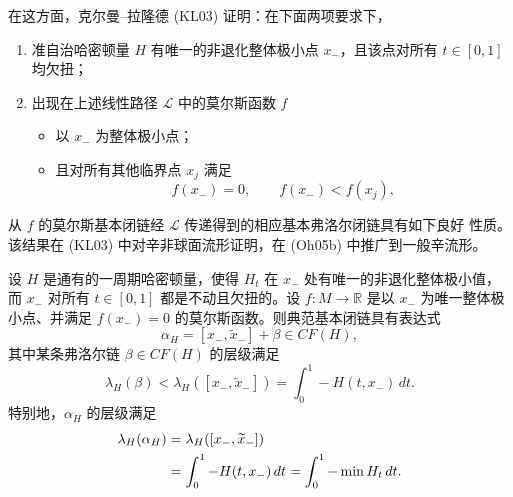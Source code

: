在这方面，克尔曼--拉隆德 (KL03) 证明：在下面两项要求下，
\begin{enumerate}
 \item 准自治哈密顿量 $H$ 有唯一的非退化整体极小点 $x_-$，且该点对所有
 $t\in[0,1]$ 均欠扭；
 \item 出现在上述线性路径 $\mathcal L$ 中的莫尔斯函数 $f$
 \begin{itemize}
  \item 以 $x_-$ 为整体极小点；
  \item 且对所有其他临界点 $x_j$ 满足
  \begin{equation}
   f(x_-)=0,\qquad f(x_-)<f(x_j),
   \label{eq:22-morse-minimum-condition}
  \end{equation}
 \end{itemize}
\end{enumerate}
从 $f$ 的莫尔斯基本闭链经 $\mathcal L$ 传递得到的相应基本弗洛尔闭链具有如下良好
性质。该结果在 (KL03) 中对辛非球面流形证明，在 (Oh05b) 中推广到一般辛流形。

\begin{proposition}
\label{prop:22-canonical-fundamental-cycle}
设 $H$ 是通有的一周期哈密顿量，使得 $H_t$ 在 $x_-$ 处有唯一的非退化整体极小值，
而 $x_-$ 对所有 $t\in[0,1]$ 都是不动且欠扭的。设 $f:M\to\mathbb R$ 是以 $x_-$
为唯一整体极小点、并满足 $f(x_-)=0$ 的莫尔斯函数。则典范基本闭链具有表达式
\begin{equation}
 \alpha_H=[x_-,\widetilde x_-]+\beta\in CF(H),
 \label{eq:22-fundamental-cycle-expression}
\end{equation}
其中某条弗洛尔链 $\beta\in CF(H)$ 的层级满足
\begin{equation}
 \lambda_H(\beta)<\lambda_H([x_-,\widetilde x_-])
 =\int_0^1-H(t,x_-)\,dt.
 \label{eq:22-beta-level}
\end{equation}
特别地，$\alpha_H$ 的层级满足
\begin{align}
 \lambda_H(\alpha_H)
 &=\lambda_H([x_-,\widetilde x_-])
 \label{eq:22-fundamental-cycle-level}\\
 &=\int_0^1-H(t,x_-)\,dt
 =\int_0^1-\min H_t\,dt.\notag
\end{align}
\end{proposition}

